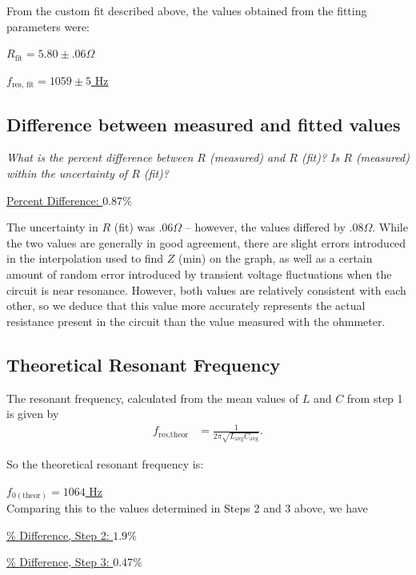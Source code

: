 \documentclass[twocolumn,english]{IEEEtran}
\theoremstyle{plain}
\theoremstyle{plain}
\begin{document}
From the custom fit described above, the values obtained from the fitting parameters were:

\hfill\underline{$R_{\text{fit}} = 5.80 \pm .06 \Omega$}

\hfill\underline{$f_{\text{res, fit}} = 1059 \pm 5$ Hz}


\hrulefill

\subsection{Difference between measured and fitted values}

\textit{What is the percent difference between $R$ (measured) and $R$ (fit)? Is $R$ (measured) within the uncertainty of $R$ (fit)?}

\hfill\underline{Percent Difference: $0.87\%$}

The uncertainty in $R$ (fit) was $.06\Omega$ -- however, the values differed by $.08\Omega$. While the two values are generally in good agreement, there are slight errors introduced in the interpolation used to find $Z$ (min) on the graph, as well as a certain amount of random error introduced by transient voltage fluctuations when the circuit is near resonance. However, both values are relatively consistent with each other, so we deduce that this value more accurately represents the actual resistance present in the circuit than the value measured with the ohmmeter.

\hrulefill

\subsection{Theoretical Resonant Frequency}
The resonant frequency, calculated from the mean values of $L$ and $C$ from step 1 is given by
\begin{align}
	f_{\text{res,theor}} &= \frac{1}{2\pi\sqrt{L_{\text{avg}} C_{\text{avg}}}}.
\end{align}

So the theoretical resonant frequency is:

\hfill\underline{$f_{0(\text{theor})} = 1064$ Hz} \\

Comparing this to the values determined in Steps 2 and 3 above, we have

\hfill\underline{\% Difference, Step 2: $1.9\%$}

\hfill\underline{\% Difference, Step 3: $0.47\%$}
\end{document}
